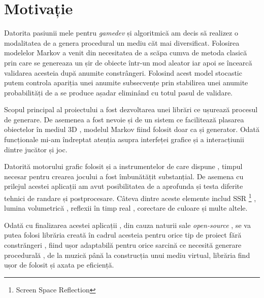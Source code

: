 \chapter*{Motivație} 

Datorita pasiunii mele pentru \textit{gamedev} și algoritmică am decis să realizez o modalitatea de a genera procedural un mediu căt mai diversificat. Folosirea modelelor Markov a venit din necesitatea de a scăpa cumva de metoda clasică prin care se genereaza un șir de obiecte într-un mod aleator iar apoi se încearcă validarea acesteia după anumite constrângeri. Folosind acest model stocastic putem controla apariția unei anumite subsecvențe prin stabilirea unei anumite probabilități de a se produce așadar eliminând cu totul pasul de validare.\par

Scopul principal al proiectului a fost dezvoltarea unei librări ce ușurează procesul de generare. De asemenea a fost nevoie și de un sistem ce facilitează plasarea obiectelor în mediul 3D , modelul Markov fiind folosit doar ca și generator. Odată funcționale mi-am îndreptat atenția asupra interfeței grafice și a interacțiunii dintre jucător și joc.\par

Datorită motorului grafic folosit și a instrumentelor de care dispune , timpul necesar pentru crearea jocului a fost îmbunătățit substanțial. De asemena cu prilejul acestei aplicații am avut posibilitatea de a aprofunda și testa diferite tehnici de randare și postprocesare. Câteva dintre aceste elemente includ SSR \footnote{Screen Space Reflection} , lumina volumetrică  , reflexii în timp real , corectare de culoare și multe altele.\par

Odată cu finalizarea acestei aplicații , din cauza naturii sale \textit{open-source} , se va putea folosi librăria creată în cadrul acesteia pentru orice tip de proiect fără constrăngeri , fiind ușor adaptabilă pentru orice sarcină ce necesită generare procedurală , de la muzică până la construcția unui mediu virtual, librăria find ușor de folosit și axata pe eficiență.\par